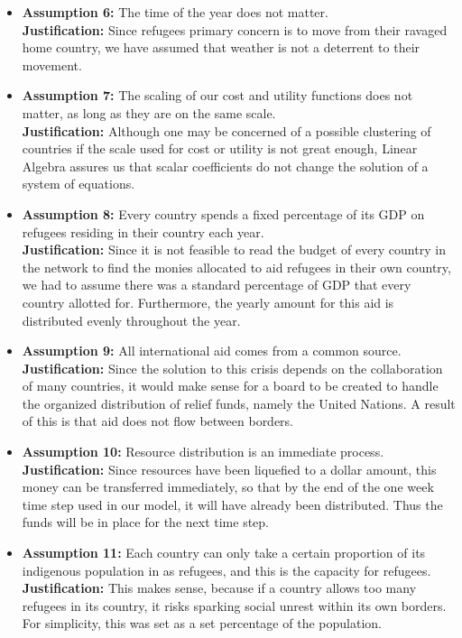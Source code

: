 \documentclass{article}
\begin{document}
\begin{itemize}
\item \textbf{Assumption 6:} The time of the year does not matter.\\
\noindent \textbf{Justification:} Since refugees primary concern is to move from their ravaged home country, we have assumed that weather is not a deterrent to their movement.

\item \textbf{Assumption 7:} The scaling of our cost and utility functions does not matter, as long as they are on the same scale.\\
\noindent \textbf{Justification:} Although one may be concerned of a possible clustering of countries if the scale used for cost or utility is not great enough, Linear Algebra assures us that scalar coefficients do not change the solution of a system of equations.

\item \textbf{Assumption 8:} Every country spends a fixed percentage of its GDP on refugees residing in their country each year.\\
\noindent \textbf{Justification: } Since it is not feasible to read the budget of every country in the network to find the monies allocated to aid refugees in their own country, we had to assume there was a standard percentage of GDP that every country allotted for. Furthermore, the yearly amount for this aid is distributed evenly throughout the year.

\item \textbf{Assumption 9:} All international aid comes from a common source.\\
\noindent \textbf{Justification: } Since the solution to this crisis depends on the collaboration of many countries, it would make sense for a board to be created to handle the organized distribution of relief funds, namely the United Nations. A result of this is that aid does not flow between borders.

\item \textbf{Assumption 10: } Resource distribution is an immediate process.\\
\noindent \textbf{Justification: } Since resources have been liquefied to a dollar amount, this money can be transferred immediately, so that by the end of the one week time step used in our model, it will have already been distributed. Thus the funds will be in place for the next time step.

\item \textbf{Assumption 11: } Each country can only take a certain proportion of its indigenous population in as refugees, and this is the capacity for refugees.\\
\noindent \textbf{Justification: } This makes sense, because if a country allows too many refugees in its country, it risks sparking social unrest within its own borders. For simplicity, this was set as a set percentage of the population.

\end{itemize}
\end{document}

